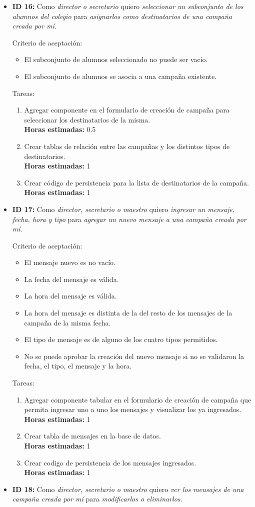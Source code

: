 \documentclass[a4paper, 10pt, twoside]{article}
\newenvironment{stories}{
  \begin{itemize}
}{
  \end{itemize}
}
\newcommand{\storyid}[4]{
  \item
  \textbf{ID #1:} Como \emph{#2} quiero \emph{#3} para \emph{#4}.
}
\newenvironment{tasks}{
  Tareas:
  \begin{enumerate}
}{
  \end{enumerate}
}
\newcommand{\task}[1] {
  \item #1.\\
  \textbf{Horas estimadas:}
}
\newenvironment{criterios}{
  Criterio de aceptación:
  \begin{itemize}
}{
  \end{itemize}
}
\newcommand{\criteria}[1] {
  \item #1
}
\begin{document}
\begin{stories}
  \begin{tasks}
    \task{Modificar componente de selección de destinatarios para sólo permitir seleccionar alumnos del maestro y/o sus padres cuando el usuario actual tenga el rol de maestro} 2
  \end{tasks}


  \storyid{16}
          {director o secretario}
          {seleccionar un subconjunto de los alumnos del colegio}
          {asignarlos como destinatarios de una campaña creada por mí}
        
   \begin{criterios}
  	\criteria{El subconjunto de alumnos seleccionado no puede ser vacío.}
    \criteria{El subconjunto de alumnos se asocia a una campaña existente.}
  \end{criterios} 

  \begin{tasks}
    \task{Agregar componente en el formulario de creación de campaña para seleccionar los destinatarios de la misma} 0.5
    \task{Crear tablas de relación entre las campañas y los distintos tipos de destinatarios} 1
    \task{Crear código de persistencia para la lista de destinatarios de la campaña} 1
  \end{tasks}
  
  
  \storyid{17}{director, secretario o maestro}
             {ingresar un mensaje, fecha, hora y tipo}
             {agregar un nuevo mensaje a una campaña creada por mí}

   \begin{criterios}
  	\criteria{El mensaje nuevo es no vacío.}
    \criteria{La fecha del mensaje es válida.}
    \criteria{La hora del mensaje es válida.}
    \criteria{La hora del mensaje es distinta de la del resto de los mensajes de la campaña de la misma fecha.}
    \criteria{El tipo de mensaje es de alguno de los cuatro tipos permitidos.}
    \criteria{No se puede aprobar la creación del nuevo mensaje si no se validaron la fecha, el tipo, el mensaje y la hora.}
  \end{criterios} 
   
  \begin{tasks}
    \task{Agregar componente tabular en el formulario de creación de campaña que permita ingresar uno a uno los mensajes y visualizar los ya ingresados} 1
    \task{Crear tabla de mensajes en la base de datos} 1
    \task{Crear codigo de persistencia de los mensajes ingresados} 1
  \end{tasks}


  \storyid{18}
          {director, secretario o maestro}
          {ver los mensajes de una campaña creada por mí}
          {modificarlos o eliminarlos}


\end{stories}
\end{document}
